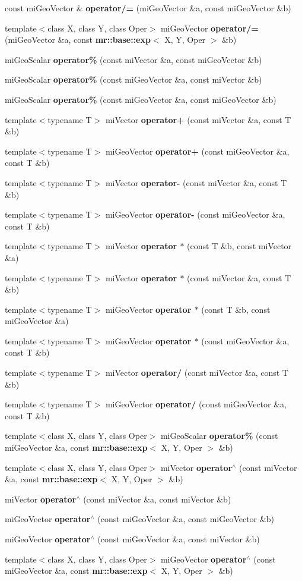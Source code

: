 \begin{CompactItemize}
\item 
const mi\-Geo\-Vector \& {\bf operator/=} (mi\-Geo\-Vector \&a, const mi\-Geo\-Vector \&b)
\item 
template$<$class X, class Y, class Oper$>$ mi\-Geo\-Vector {\bf operator/=} (mi\-Geo\-Vector \&a, const {\bf mr::base::exp}$<$ X, Y, Oper $>$ \&b)
\item 
mi\-Geo\-Scalar {\bf operator\%} (const mi\-Vector \&a, const mi\-Geo\-Vector \&b)
\item 
mi\-Geo\-Scalar {\bf operator\%} (const mi\-Geo\-Vector \&a, const mi\-Vector \&b)
\item 
mi\-Geo\-Scalar {\bf operator\%} (const mi\-Geo\-Vector \&a, const mi\-Geo\-Vector \&b)
\item 
template$<$typename T$>$ mi\-Vector {\bf operator+} (const mi\-Vector \&a, const T \&b)
\item 
template$<$typename T$>$ mi\-Geo\-Vector {\bf operator+} (const mi\-Geo\-Vector \&a, const T \&b)
\item 
template$<$typename T$>$ mi\-Vector {\bf operator-} (const mi\-Vector \&a, const T \&b)
\item 
template$<$typename T$>$ mi\-Geo\-Vector {\bf operator-} (const mi\-Geo\-Vector \&a, const T \&b)
\item 
template$<$typename T$>$ mi\-Vector {\bf operator $\ast$} (const T \&b, const mi\-Vector \&a)
\item 
template$<$typename T$>$ mi\-Vector {\bf operator $\ast$} (const mi\-Vector \&a, const T \&b)
\item 
template$<$typename T$>$ mi\-Geo\-Vector {\bf operator $\ast$} (const T \&b, const mi\-Geo\-Vector \&a)
\item 
template$<$typename T$>$ mi\-Geo\-Vector {\bf operator $\ast$} (const mi\-Geo\-Vector \&a, const T \&b)
\item 
template$<$typename T$>$ mi\-Vector {\bf operator/} (const mi\-Vector \&a, const T \&b)
\item 
template$<$typename T$>$ mi\-Geo\-Vector {\bf operator/} (const mi\-Geo\-Vector \&a, const T \&b)
\item 
template$<$class X, class Y, class Oper$>$ mi\-Geo\-Scalar {\bf operator\%} (const mi\-Geo\-Vector \&a, const {\bf mr::base::exp}$<$ X, Y, Oper $>$ \&b)
\item 
template$<$class X, class Y, class Oper$>$ mi\-Vector {\bf operator$^\wedge$} (const mi\-Vector \&a, const {\bf mr::base::exp}$<$ X, Y, Oper $>$ \&b)
\item 
mi\-Vector {\bf operator$^\wedge$} (const mi\-Vector \&a, const mi\-Vector \&b)
\item 
mi\-Geo\-Vector {\bf operator$^\wedge$} (const mi\-Geo\-Vector \&a, const mi\-Geo\-Vector \&b)
\item 
mi\-Geo\-Vector {\bf operator$^\wedge$} (const mi\-Geo\-Vector \&a, const mi\-Vector \&b)
\item 
template$<$class X, class Y, class Oper$>$ mi\-Geo\-Vector {\bf operator$^\wedge$} (const mi\-Geo\-Vector \&a, const {\bf mr::base::exp}$<$ X, Y, Oper $>$ \&b)
\end{CompactItemize}


